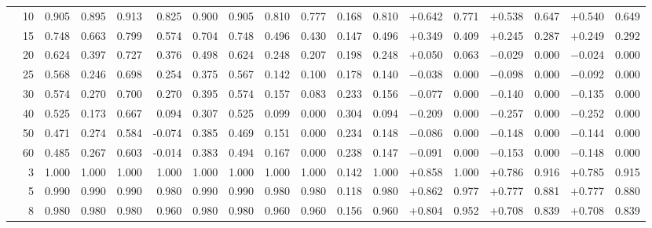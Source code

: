 \documentclass[conference]{IEEEtran}
\theoremstyle{remark}
\begin{document}
\begin{table}[ht]
{\begin{tabular}{p{2.2cm}r rrrr rr rr rr rr rr rr}
  & 10 & 0.905 & 0.895 & 0.913 & 0.825 & 0.900 & 0.905 & 0.810 & 0.777 & 0.168 & 0.810 & $+$0.642 & 0.771 & $+$0.538 & 0.647 & $+$0.540 & 0.649 \\
  & 15 & 0.748 & 0.663 & 0.799 & 0.574 & 0.704 & 0.748 & 0.496 & 0.430 & 0.147 & 0.496 & $+$0.349 & 0.409 & $+$0.245 & 0.287 & $+$0.249 & 0.292 \\
  & 20 & 0.624 & 0.397 & 0.727 & 0.376 & 0.498 & 0.624 & 0.248 & 0.207 & 0.198 & 0.248 & $+$0.050 & 0.063 & $-$0.029 & 0.000 & $-$0.024 & 0.000 \\
  & 25 & 0.568 & 0.246 & 0.698 & 0.254 & 0.375 & 0.567 & 0.142 & 0.100 & 0.178 & 0.140 & $-$0.038 & 0.000 & $-$0.098 & 0.000 & $-$0.092 & 0.000 \\
  & 30 & 0.574 & 0.270 & 0.700 & 0.270 & 0.395 & 0.574 & 0.157 & 0.083 & 0.233 & 0.156 & $-$0.077 & 0.000 & $-$0.140 & 0.000 & $-$0.135 & 0.000 \\
  & 40 & 0.525 & 0.173 & 0.667 & 0.094 & 0.307 & 0.525 & 0.099 & 0.000 & 0.304 & 0.094 & $-$0.209 & 0.000 & $-$0.257 & 0.000 & $-$0.252 & 0.000 \\
  & 50 & 0.471 & 0.274 & 0.584 & -0.074 & 0.385 & 0.469 & 0.151 & 0.000 & 0.234 & 0.148 & $-$0.086 & 0.000 & $-$0.148 & 0.000 & $-$0.144 & 0.000 \\
  & 60 & 0.485 & 0.267 & 0.603 & -0.014 & 0.383 & 0.494 & 0.167 & 0.000 & 0.238 & 0.147 & $-$0.091 & 0.000 & $-$0.153 & 0.000 & $-$0.148 & 0.000 \\
\midrule
{}
  & 3  & 1.000 & 1.000 & 1.000 & 1.000 & 1.000 & 1.000 & 1.000 & 1.000 & 0.142 & 1.000 & $+$0.858 & 1.000 & $+$0.786 & 0.916 & $+$0.785 & 0.915 \\
  & 5  & 0.990 & 0.990 & 0.990 & 0.980 & 0.990 & 0.990 & 0.980 & 0.980 & 0.118 & 0.980 & $+$0.862 & 0.977 & $+$0.777 & 0.881 & $+$0.777 & 0.880 \\
  & 8  & 0.980 & 0.980 & 0.980 & 0.960 & 0.980 & 0.980 & 0.960 & 0.960 & 0.156 & 0.960 & $+$0.804 & 0.952 & $+$0.708 & 0.839 & $+$0.708 & 0.839 \\

\end{tabular}}
\end{table}
\end{document}
